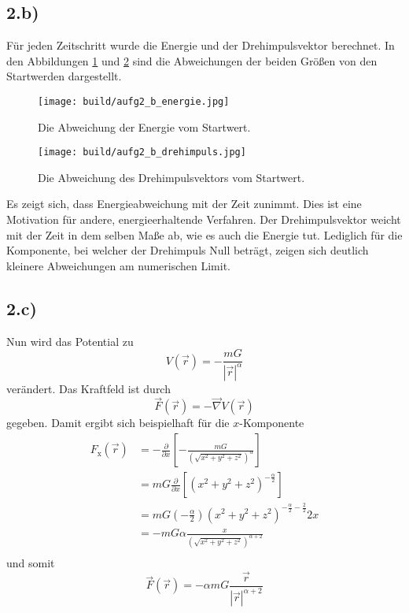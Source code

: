 \subsection*{2.b)}
Für jeden Zeitschritt wurde die Energie und der Drehimpulsvektor berechnet.
In den Abbildungen \ref{fig:2_energie} und \ref{fig:2_drehimpuls} sind die Abweichungen
der beiden Größen von den Startwerden dargestellt.
\begin{figure}
  \centering
  \texttt{[image: build/aufg2\_b\_energie.jpg]}
  \caption{Die Abweichung der Energie vom Startwert.}
  \label{fig:2_energie}
\end{figure}
\begin{figure}
  \centering
  \texttt{[image: build/aufg2\_b\_drehimpuls.jpg]}
  \caption{Die Abweichung des Drehimpulsvektors vom Startwert.}
  \label{fig:2_drehimpuls}
\end{figure}
Es zeigt sich, dass Energieabweichung mit der Zeit zunimmt. Dies ist eine Motivation für
andere, energieerhaltende Verfahren.
Der Drehimpulsvektor weicht mit der Zeit in dem selben Maße ab, wie es auch die Energie
tut. Lediglich für die Komponente, bei welcher der Drehimpuls Null beträgt, zeigen
sich deutlich kleinere Abweichungen am numerischen Limit.

\subsection*{2.c)}
Nun wird das Potential zu
\begin{equation*}
    V\!\left(\vec{r}\right) =
    - \frac{m G}{\left|\vec{r}\right|^\alpha}
\end{equation*}
verändert.
Das Kraftfeld ist durch
\begin{equation*}
    \vec{F}\!\left(\vec{r}\right)
    = - \vec{\nabla} V\!\left(\vec{r}\right)
\end{equation*}
gegeben. Damit ergibt sich beispielhaft für die $x$-Komponente
\begin{align*}
    F_\text{x}\!\left(\vec{r}\right)
    &= -\frac{\partial}{\partial x}
        \left[- \frac{m G}{\left(\sqrt{x^2 + y^2 + z^2}\right)^\alpha}\right] \\
    &= m G \frac{\partial}{\partial x}
        \left[\left(x^2 + y^2 + z^2\right)^{-\frac{\alpha}{2}}\right] \\
    &= m G \left(-\frac{\alpha}{2}\right)
        \left(x^2 + y^2 + z^2\right)^{-\frac{\alpha}{2}-\frac{2}{2}}
        2 x \\
    &= - m G \alpha
        \frac{x}{\left(\sqrt{x^2 + y^2 + z^2}\right)^{\alpha+2}} \\
\end{align*}
und somit
\begin{equation*}
    \vec{F}\!\left(\vec{r}\right)
    = -\alpha m G \frac{\vec{r}}{\left|\vec{r}\right|^{\alpha +2}}
\end{equation*}

